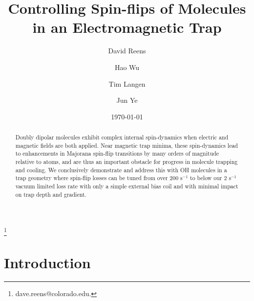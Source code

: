 \documentclass[%
 reprint,
 amsmath,amssymb,
 aps,
pra,
]{revtex4-1}
\begin{document}
\title{Controlling Spin-flips of Molecules in an Electromagnetic Trap}%

\author{David Reens}
\thanks{dave.reens@colorado.edu.}

\author{Hao Wu}

\author{Tim Langen}%

\author{Jun Ye}


\date{\today}


\begin{abstract}
Doubly dipolar molecules exhibit complex internal spin-dynamics when electric and magnetic fields are both applied.
Near magnetic trap minima, these spin-dynamics lead to enhancements in Majorana spin-flip transitions by many orders of magnitude relative to atoms, and are thus an important obstacle for progress in molecule trapping and cooling.
We conclusively demonstrate and address this with OH molecules in a trap geometry where spin-flip losses can be tuned from over $200 \text{ s}^{-1} $ to below our $2\text{ s}^{-1}$ vacuum limited loss rate with only a simple external bias coil and with minimal impact on trap depth and gradient.
\end{abstract}


\maketitle


\section{Introduction}
\end{document}
